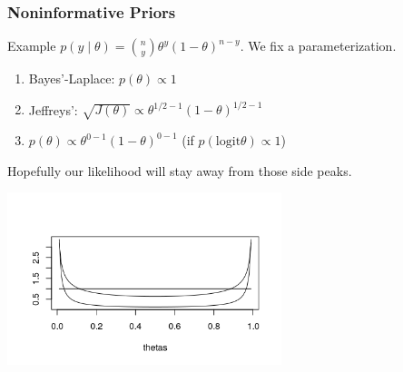 \documentclass{beamer}
\begin{document}

\begin{frame}[fragile]
\frametitle{Noninformative Priors}

Example $p(y \mid \theta) = \binom{n}{y} \theta^y (1-\theta)^{n-y}$. We fix a parameterization. 
\newline

\begin{enumerate}
\item Bayes'-Laplace: $p(\theta) \propto 1$
\item Jeffreys': $\sqrt{J(\theta)} \propto \theta^{1/2-1}(1-\theta)^{1/2-1}$
\item $p(\theta) \propto \theta^{0-1}(1-\theta)^{0-1}$ (if $p(\text{logit} \theta) \propto 1$)
\end{enumerate}

Hopefully our likelihood will stay away from those side peaks.


\begin{center}
\includegraphics[width=80mm]{pics/Rplot2.png}
\end{center}


\end{frame}
\end{document}
